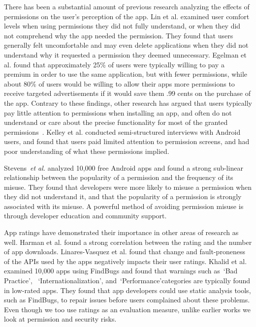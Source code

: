 \documentclass{sig-alternate-05-2015}
\begin{document}
There has been a substantial amount of previous research analyzing the effects of permissions on the user's perception of the app. Lin et al.\cite{Lin:2012:EPU:2370216.2370290} examined user comfort levels when using permissions they did not fully understand, or when they did not comprehend why the app needed the permission. They found that users generally felt uncomfortable and may even delete applications when they did not understand why it requested a permission they deemed unnecessary. Egelman et al.\cite{Egelman12choicearchitecture} found that approximately 25\% of users were typically willing to pay a premium in order to use the same application, but with fewer permissions, while about 80\% of users would be willing to allow their apps more permissions to receive targeted advertisements if it would save them .99 cents on the purchase of the app. Contrary to these findings, other research has argued that users typically pay little attention to permissions when installing an app, and often do not understand or care about the precise functionality for most of the granted permissions~\cite{Felt:2012:APU:2335356.2335360}. Kelley et al. \cite{Kelley:2012:CPI:2426020.2426027} conducted semi-structured interviews with Android users, and found that users paid limited attention to permission screens, and had poor understanding of what these permissions implied.

Stevens~\emph{et al.}\cite{Stevens:2013:APU:2487085.2487093} analyzed 10,000 free Android apps and found a strong sub-linear relationship between the popularity of a permission and the frequency of its misuse. They found that developers were more likely to misuse a permission when they did not understand it, and that the popularity of a permission is strongly associated with its misuse. A powerful method of avoiding permission misuse is through developer education and community support.

App ratings have demonstrated their importance in other areas of research as well. Harman et al.\cite{6224306} found a strong correlation between the rating and the number of app downloads. Linares-Vasquez et al.\cite{Linares-Vasquez:2013:ACF:2491411.2491428} found that change and fault-proneness of the APIs used by the apps negatively impacts their user ratings. Khalid et al.\cite{Khalid_Mei_Examinging} examined 10,000 apps using FindBugs and found that warnings such as~\lq Bad Practice\rq, ~\lq Internationalization\rq, and~\lq Performance\rq  categories are typically found in low-rated apps. They found that app developers could use static analysis tools, such as FindBugs, to repair issues before users complained about these problems. Even though we too use ratings as an evaluation measure, unlike earlier works we look at permission and security risks.
\end{document}
